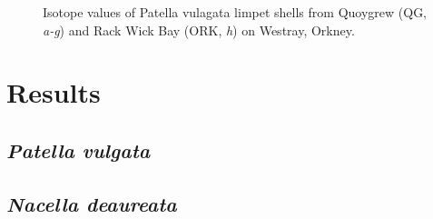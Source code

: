 \documentclass[
  authoryear,
  preprint,
  3p]{elsarticle}
\begin{document}
\begin{figure}


\caption{\label{fig-Pat_iso}Isotope values of Patella vulagata limpet
shells from Quoygrew (QG, \emph{a-g}) and Rack Wick Bay (ORK, \emph{h})
on Westray, Orkney.}

\end{figure}%

\section{Results}\label{Results}

\subsection{\texorpdfstring{\emph{Patella
vulgata}}{Patella vulgata}}\label{patella-vulgata}

\subsection{\texorpdfstring{\emph{Nacella
deaureata}}{Nacella deaureata}}\label{nacella-deaureata}
\end{document}
